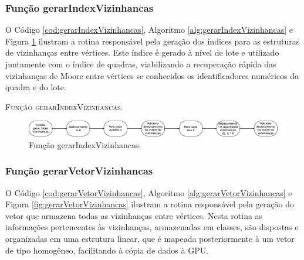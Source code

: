 \newpage

\subsubsection{Função gerarIndexVizinhancas}

O Código \ref{cod:gerarIndexVizinhancas}, Algoritmo \ref{alg:gerarIndexVizinhancas} e Figura \ref{fig:gerarIndexVizinhancas} ilustram a rotina responsável pela geração dos índices para as estruturas de vizinhanças entre vértices. Este índice é gerado à nível de lote e utilizado juntamente com o índice de quadras, viabilizando a recuperação rápida das vizinhanças de Moore entre vértices se conhecidos os identificadores numéricos da quadra e do lote. 



\begin{algorithm}[H]
   \SetAlgoLined   
   
   \caption{\textsc{Função gerarIndexVizinhancas.}}
   \label{alg:gerarIndexVizinhancas}
\end{algorithm}

\begin{figure}[H]
  \centering
  \includegraphics[width=1\textwidth]{Figuras/Simula/Fluxos/gerarIndexVizinhancas.eps}
  \caption{Função gerarIndexVizinhancas.}
  \label{fig:gerarIndexVizinhancas}
\end{figure} 

\newpage

\subsubsection{Função gerarVetorVizinhancas}

O Código \ref{cod:gerarVetorVizinhancas}, Algoritmo \ref{alg:gerarVetorVizinhancas} e Figura \ref{fig:gerarVetorVizinhancas} ilustram a rotina responsável pela geração do vetor que armazena todas as vizinhanças entre vértices. Nesta rotina as informações pertencentes às vizinhanças, armazenadas em classes, são dispostas e organizadas em uma estrutura linear, que é mapeada posteriormente à um vetor de tipo homogêneo, facilitando à cópia de dados à GPU.

